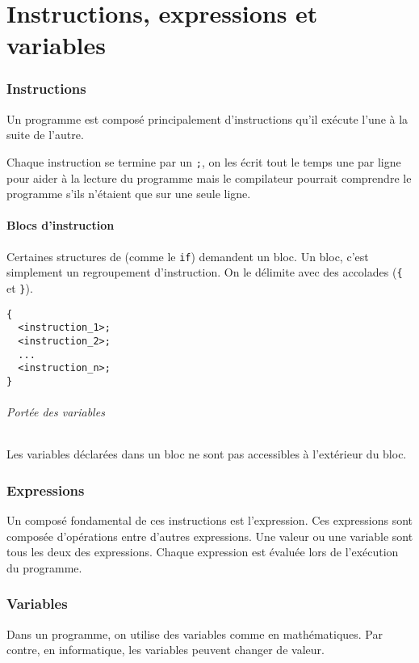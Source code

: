 



\part{Instructions, expressions et variables}

\section{Instructions}
Un programme est composé principalement d'instructions qu'il exécute l'une à la
suite de l'autre.

Chaque instruction se termine par un \lstinline|;|, on les écrit tout le temps
une par ligne pour aider à la lecture du programme mais le compilateur
pourrait comprendre le programme s'ils n'étaient que sur une seule ligne.

\subsection{Blocs d'instruction}
Certaines structures de \java{} (comme le \lstinline|if|) demandent un bloc.
Un bloc, c'est simplement un regroupement d'instruction.
On le délimite avec des accolades
(\lstinline|{| et \lstinline|}|).
\begin{lstlisting}
{
  <instruction_1>;
  <instruction_2>;
  ...
  <instruction_n>;
}
\end{lstlisting}

\paragraph{Portée des variables}
Les variables déclarées dans un bloc ne sont pas accessibles à l'extérieur
du bloc.

\section{Expressions}
Un composé fondamental de ces instructions est l'expression.
Ces expressions sont composée d'opérations entre d'autres expressions.
Une valeur ou une variable sont tous les deux des expressions.
Chaque expression est évaluée lors de l'exécution du programme.

\section{Variables}
Dans un programme, on utilise des variables comme en mathématiques.
Par contre, en informatique, les variables peuvent changer de valeur.

